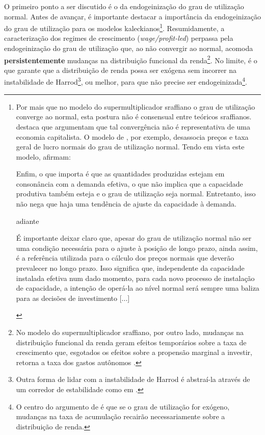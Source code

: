 O primeiro ponto a ser discutido é o da endogeinização do grau de utilização normal.
Antes de avançar, é importante destacar a importância da endogeinização do grau de utilização para os modelos kaleckianos\footnote{
	Por mais que no modelo do supermultiplicador sraffiano o grau de utilização converge ao normal, esta postura não é consensual entre teóricos sraffianos. \textcite[p.~161]{cesaratto_neo-kaleckian_2015} destaca que \textcites{garegnani_notes_1992}{palumbo_growth_2003} argumentam que tal convergência não é representativa de uma economia capitalista. O modelo de \textcite[Orignial de 1986]{ciccone_2017}, por exemplo, desassocia preços e taxa geral de lucro normais do grau de utilização normal. Tendo em vista este modelo, \textcite[p.~476]{moreira_demanda_2018} afirmam:
	
	\begin{citacao}
		Enfim, o que importa é que as
		quantidades produzidas estejam em consonância com a demanda efetiva, o que não
		implica que a capacidade produtiva também esteja e o grau de utilização seja normal.
		Entretanto, isso não nega que haja uma tendência de ajuste da capacidade à demanda.
	\end{citacao}
	adiante
	\begin{citacao}
		É importante deixar claro que, apesar do grau de utilização normal não ser
		uma condição necessária para o ajuste à posição de longo prazo, ainda assim, é a
		referência utilizada para o cálculo dos preços normais que deverão prevalecer no
		longo prazo. Isso significa que, independente da capacidade instalada efetiva num
		dado momento, para cada novo processo de instalação de capacidade, a intenção de
		operá-la ao nível normal será sempre uma baliza para as decisões de investimento [...]
		\cite[p.~477]{moreira_demanda_2018}
	\end{citacao}}.
Resumidamente, a caracterização dos regimes de crescimento (\textit{wage/profit-led}) perpassa pela endogeinização do grau de utilização que, ao não convergir ao normal, acomoda  \textbf{persistentemente} mudanças na distribuição funcional da renda\footnote{
	No modelo do supermultiplicador sraffiano, por outro lado, mudanças na distribuição funcional da renda geram efeitos temporários sobre a taxa de crescimento que, esgotados os efeitos sobre a propensão marginal a investir, retorna a taxa dos gastos autônomos \cite[p.~ 79]{serrano_sraffian_2017}.
}.  
No limite, é o que garante que a distribuição de renda possa ser exógena sem incorrer na instabilidade de Harrod\footnote{
	Outra forma de lidar com a instabilidade de Harrod é abstraí-la através de um corredor de estabilidade como em \textcites{dutt_growth_1990}{setterfield_long-run_2017}.
}, ou melhor, para que não precise ser endogeinizada\footnote{
	O centro do argumento de \textcite[p.~155--160]{amadeo_role_1986} é que se o grau de utilização for exógeno, mudanças na taxa de acumulação recairão necessariamente sobre a distribuição de renda.
}.
